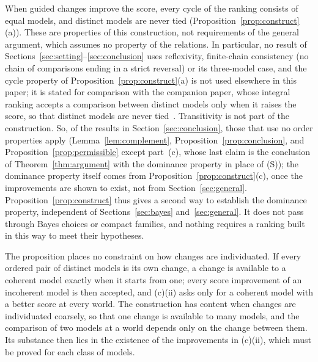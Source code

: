 \documentclass[11pt]{article}
\theoremstyle{definition}
\theoremstyle{remark}
\begin{document}
When guided changes improve the score, every cycle of the ranking consists of equal models, and distinct models are never tied (Proposition~\ref{prop:construct}(a)). These are properties of this construction, not requirements of the general argument, which assumes no property of the relations. In particular, no result of Sections~\ref{sec:setting}--\ref{sec:conclusion} uses reflexivity, finite-chain consistency (no chain of comparisons ending in a strict reversal) or its three-model case, and the cycle property of Proposition~\ref{prop:construct}(a) is not used elsewhere in this paper; it is stated for comparison with the companion paper, whose integral ranking accepts a comparison between distinct models only when it raises the score, so that distinct models are never tied~\cite[Lemma~5.3(b)]{KCM}. Transitivity is not part of the construction. So, of the results in Section~\ref{sec:conclusion}, those that use no order properties apply (Lemma~\ref{lem:complement}, Proposition~\ref{prop:conclusion}, and Proposition~\ref{prop:permissible} except part~(c), whose last claim is the conclusion of Theorem~\ref{thm:argument} with the dominance property in place of (S)); the dominance property itself comes from Proposition~\ref{prop:construct}(c), once the improvements are shown to exist, not from Section~\ref{sec:general}. Proposition~\ref{prop:construct} thus gives a second way to establish the dominance property, independent of Sections~\ref{sec:bayes} and~\ref{sec:general}. It does not pass through Bayes choices or compact families, and nothing requires a ranking built in this way to meet their hypotheses.

The proposition places no constraint on how changes are individuated. If every ordered pair of distinct models is its own change, a change is available to a coherent model exactly when it starts from one; every score improvement of an incoherent model is then accepted, and (c)(ii) asks only for a coherent model with a better score at every world. The construction has content when changes are individuated coarsely, so that one change is available to many models, and the comparison of two models at a world depends only on the change between them. Its substance then lies in the existence of the improvements in (c)(ii), which must be proved for each class of models.
\end{document}
